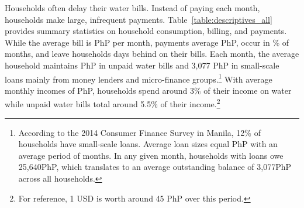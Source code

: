 \documentclass[12pt,table]{article}
\begin{document}
Households often delay their water bills.  Instead of paying each month, households make large, infrequent payments.  Table~\ref{table:descriptives_all} provides summary statistics on household consumption, billing, and payments.  While the average bill is PhP per month, payments average PhP, occur in \unskip\% of months, and leave households days behind on their bills.  Each month, the average household maintains PhP in unpaid water bills and 3,077 PhP in small-scale loans mainly from money lenders and micro-finance groups.\footnote{According to the 2014 Consumer Finance Survey in Manila, 12\% of households have small-scale loans.  Average loan sizes equal PhP with an average period of months.  In any given month, households with loans owe 25,640PhP, which translates to an average outstanding balance of 3,077PhP across all households.}   With average monthly incomes of PhP, households spend around 3\% of their income on water while unpaid water bills total around 5.5\% of their income.\footnote{For reference, 1 USD is worth around 45 PhP over this period.}   
\end{document}
